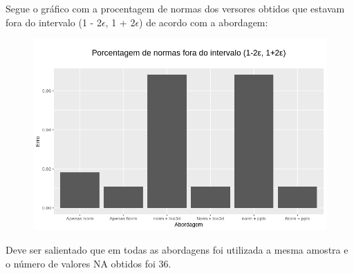 \documentclass[12pt]{article}
\begin{document}
Segue o gráfico com a procentagem de normas dos versores obtidos que estavam fora do intervalo (1 - 2$\epsilon$, 1 + 2$\epsilon$) de acordo com a abordagem:

\begin{figure}[!h]
    \centering
    \includegraphics[width = \linewidth]{../../Figures/report_18_12_06/dif_two_eps.png}
\end{figure}

Deve ser salientado que em todas as abordagens foi utilizada a mesma amostra e o número de valores NA obtidos foi 36.
\end{document}
